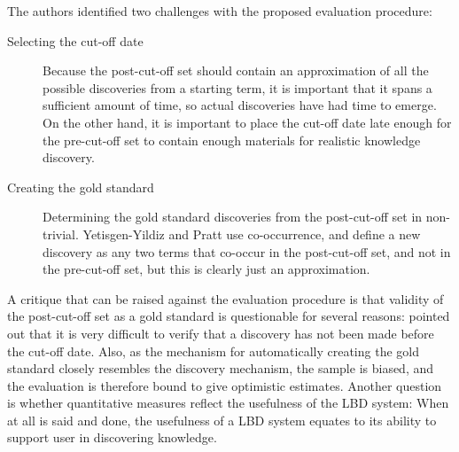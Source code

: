 The authors identified two challenges with the proposed evaluation procedure: 
\begin{description}
\item[Selecting the cut-off date] Because the post-cut-off set should contain an approximation of all the possible discoveries from a starting term, it is important that it spans a sufficient amount of time, so actual discoveries have had time to emerge. On the other hand, it is important to place the cut-off date late enough for the pre-cut-off set to contain enough materials for realistic knowledge discovery.
\item[Creating the gold standard] Determining the gold standard discoveries from the post-cut-off set in non-trivial. Yetisgen-Yildiz and Pratt use co-occurrence, and define a new discovery as any two terms that co-occur in the post-cut-off set, and not in the pre-cut-off set, but this is clearly just an approximation.
\end{description}

A critique that can be raised against the evaluation procedure is that validity of the post-cut-off set as a gold standard is questionable for several reasons: \citet{kos07} pointed out that it is very difficult to verify that a discovery has not been made before the cut-off date. Also, as the mechanism for automatically creating the gold standard closely resembles the discovery mechanism, the sample is biased, and the evaluation is therefore bound to give optimistic estimates. Another question is whether quantitative measures reflect the usefulness of the LBD system: When at all is said and done, the usefulness of a LBD system equates to its ability to support user in discovering knowledge.